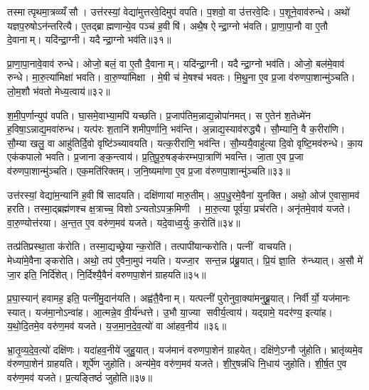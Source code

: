 तस्मात्पृथमा॒त्रव्व्यँसौ। उत्त॑रस्यां॒ वेद्या॑मुत्तरवे॒दिमुप॑ वपति। प॒शवो॒ वा उ॑त्तरवे॒दिः। प॒शूने॒वाव॑रुन्धे। अथो॑ यज्ञप॒रुषोऽन॑न्तरित्यै। ए॒तद्ब्राह्मणान्ये॒व पञ्च॑ ह॒वीषि॑। अथै॒ष ऐन्द्रा॒ग्नो भ॑वति। प्रा॒णा॒पा॒नौ वा ए॒तौ दे॒वानाम्। यदि॑न्द्रा॒ग्नी। यदैन्द्रा॒ग्नो भव॑ति॥३१॥

प्रा॒णा॒पा॒नावे॒वाव॑ रुन्धे। ओजो॒ बलं॒ वा ए॒तौ दै॒वानाम्। यदि॑न्द्रा॒ग्नी। यदैन्द्रा॒ग्नो भव॑ति। ओजो॒ बल॑मे॒वाव॑ रुन्धे। मा॒रु॒त्या॑मिक्षा॑ भवति। वा॒रु॒ण्या॑मिक्षा। मे॒षी च॑ मे॒षश्च॑ भवतः। मि॒थु॒ना ए॒व प्र॒जा व॑रुणपा॒शान्मु॑ञ्चति। लो॒म॒शौ भ॑वतो मेध्य॒त्वाय॑॥३२॥

श॒मी॒प॒र्णान्युप॑ वपति। घा॒समे॒वाभ्या॒मपि॑ यच्छति। प्र॒जाप॑तिम॒न्नाद्य॒न्नोपा॑नमत्। स ए॒तेन॑ श॒तेध्मे॑न ह॒विषा॒ऽन्नाद्य॒मवा॑रुन्ध। यत्प॑रः श॒तानि॑ शमीप॒र्णानि॒ भव॑न्ति। अ॒न्नाद्य॒स्याव॑रुद्ध्यै। सौ॒म्यानि॒ वै क॒रीरा॑णि। सौ॒म्या खलु॒ वा आहु॑तिर्दि॒वो वृष्टि॑ञ्च्यावयति। यत्क॒रीरा॑णि॒ भव॑न्ति। सौ॒म्ययै॒वाहु॑त्या दि॒वो वृष्टि॒मव॑रुन्धे। का॒य एक॑कपालो भवति। प्र॒जानाङ्क॒न्त्वाय॑। प्र॒ति॒पू॒रु॒षङ्क॑रम्भपा॒त्राणि॑ भवन्ति। जा॒ता ए॒व प्र॒जा व॑रुणपा॒शान्मु॑ञ्चति। एक॒मति॑रिक्तम्। ज॒नि॒ष्यमा॑णा ए॒व प्र॒जा व॑रुणपा॒शान्मु॑ञ्चति॥३३॥\anuvakamend[नि॒रु॒प्यन्ते॑ भवतो॒ भव॑ति मेध्य॒त्वाय॑ रुन्धे॒ षट्च॑]

उत्त॑रस्यां॒ वेद्या॑म॒न्यानि॑ ह॒वीषि॑ सादयति। दक्षि॑णायां मारु॒तीम्। अ॒प॒धु॒रमे॒वैना॑ युनक्ति। अथो॒ ओज॑ ए॒वासा॒मव॑ हरति। तस्मा॒द्ब्रह्म॑णश्च क्ष॒त्राच्च॒ विशोऽन्यतोऽपक्र॒मिणी। मा॒रु॒त्या पूर्व॑या॒ प्रच॑रति। अनृ॑तमे॒वाव॑ यजते। वा॒रु॒ण्योत्त॑रया। अ॒न्त॒त ए॒व वरु॑ण॒मव॑ यजते। यदे॒वाध्व॒र्युः क॒रोति॑॥३४॥

तत्प्र॑तिप्रस्था॒ता क॑रोति। तस्मा॒द्यच्छ्रेयान्क॒रोति॑। तत्पापी॑यान्करोति। पत्नीं वाचयति। मेध्या॑मे॒वैनाङ्करोति। अथो॒ तप॑ ए॒वैना॒मुप॑ नयति। यज्जा॒र सन्त॒न्न प्र॑ब्रू॒यात्। प्रि॒यं ज्ञा॒ति रु॑न्ध्यात्। अ॒सौ मे॑ जा॒र इति॒ निर्दि॑शेत्। नि॒र्दिश्यै॒वैनं॑ वरुणपा॒शेन॑ ग्राहयति॥३५॥

प्र॒घा॒स्यान्॑ हवामह॒ इति॒ पत्नी॑मु॒दान॑यति। अह्व॑तै॒वैनाम्। यत्पत्नी॑ पुरोनुवा॒क्या॑मनुब्रू॒यात्। निर्वीर्यो॒ यज॑मानः स्यात्। यज॑मा॒नोऽन्वा॑ह। आ॒त्मन्ने॒व वी॒र्य॑न्धत्ते। उ॒भौ या॒ज्या सवीर्य॒त्वाय॑। यद्ग्रामे॒ यदर॑ण्य॒ इत्या॑ह। य॒थो॒दि॒तमे॒व वरु॑ण॒मव॑ यजते। य॒ज॒मा॒न॒दे॒व॒त्यो॑ वा आ॑हव॒नीय॑॥३६॥

भ्रा॒तृ॒व्य॒दे॒व॒त्यो॑ दक्षि॑णः। यदा॑हव॒नीये॑ जुहु॒यात्। यज॑मानं वरुणपा॒शेन॑ ग्राहयेत्। दक्षि॑णे॒ऽग्नौ जु॑होति। भ्रातृ॑व्यमे॒व व॑रुणपा॒शेन॑ ग्राहयति। शूर्पे॑ण जुहोति। अन्य॑मे॒व वरु॑ण॒मव॑ यजते। शी॒र्॒षन्न॑धि नि॒धाय॑ जुहोति। शी॒र्\mbox{}ष॒त ए॒व वरु॑ण॒मव॑ यजते। प्र॒त्यङ्तिष्ठं॑ जुहोति॥३७॥

